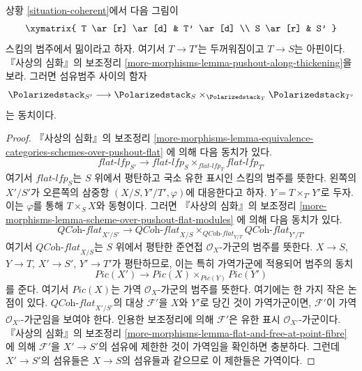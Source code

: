 \begin{lemma}
\label{lemma-polarized-RS-star}
상황 \ref{situation-coherent}에서 다음 그림이
$$
\xymatrix{
T \ar[r] \ar[d] & T' \ar[d] \\
S \ar[r] & S'
}
$$
스킴의 범주에서 밂이라고 하자. 여기서 $T \to T'$는 두꺼워짐이고
$T \to S$는 아핀이다. 『사상의 심화』의 보조정리
\ref{more-morphisms-lemma-pushout-along-thickening}을 보라. 그러면 섬유범주
사이의 함자
$$
\Polarizedstack_{S'}
\longrightarrow
\Polarizedstack_S \times_{\Polarizedstack_T} \Polarizedstack_{T'}
$$
는 동치이다.
\end{lemma}

\begin{proof}
『사상의 심화』의 보조정리
\ref{more-morphisms-lemma-equivalence-categories-schemes-over-pushout-flat}
에 의해 다음 동치가 있다.
$$
\textit{flat-lfp}_{S'}
\longrightarrow
\textit{flat-lfp}_S \times_{\textit{flat-lfp}_T} \textit{flat-lfp}_{T'}
$$
여기서 $\textit{flat-lfp}_S$는 $S$ 위에서 평탄하고 국소 유한 표시인 스킴의
범주를 뜻한다. 왼쪽의 $X'/S'$가 오른쪽의 삼중항
$(X/S, Y'/T', \varphi)$에 대응한다고 하자. $Y = T \times_{T'} Y'$로 두자.
이는 $\varphi$를 통해 $T \times_S X$와 동형이다. 그러면 『사상의 심화』의
보조정리
\ref{more-morphisms-lemma-scheme-over-pushout-flat-modules}
에 의해 다음 동치가 있다.
$$
\textit{QCoh-flat}_{X'/S'}
\longrightarrow
\textit{QCoh-flat}_{X/S}
\times_{\textit{QCoh-flat}_{Y/T}} \textit{QCoh-flat}_{Y'/T'}
$$
여기서 $\textit{QCoh-flat}_{X/S}$는 $S$ 위에서 평탄한 준연접
$\mathcal{O}_X$-가군의 범주를 뜻한다. $X \to S$, $Y \to T$, $X' \to S'$,
$Y' \to T'$가 평탄하므로, 이는 특히 가역가군에 적용되어 범주의 동치
$$
\textit{Pic}(X')
\longrightarrow
\textit{Pic}(X) \times_{\textit{Pic}(Y)} \textit{Pic}(Y')
$$
를 준다. 여기서 $\textit{Pic}(X)$는 가역 $\mathcal{O}_X$-가군의 범주를
뜻한다. 여기에는 한 가지 작은 논점이 있다. $\textit{QCoh-flat}_{X'/S'}$의
대상 $\mathcal{F}'$을 $X$와 $Y'$로 당긴 것이 가역가군이면,
$\mathcal{F}'$이 가역 $\mathcal{O}_{X'}$-가군임을 보여야 한다. 인용한
보조정리에 의해 $\mathcal{F}'$은 유한 표시 $\mathcal{O}_{X'}$-가군이다.
『사상의 심화』의 보조정리
\ref{more-morphisms-lemma-flat-and-free-at-point-fibre}
에 의해 $\mathcal{F}'$을 $X' \to S'$의 섬유에 제한한 것이 가역임을 확인하면
충분하다. 그런데 $X' \to S'$의 섬유들은 $X \to S$의 섬유들과 같으므로
이 제한들은 가역이다.


\end{proof}
